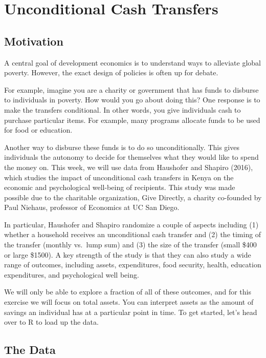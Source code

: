 \documentclass[
]{book}
\begin{document}
\chapter{Unconditional Cash Transfers}\label{unconditional-cash-transfers}

\section{Motivation}\label{motivation}

A central goal of development economics is to understand ways to alleviate global poverty. However, the exact design of policies is often up for debate.

For example, imagine you are a charity or government that has funds to disburse to individuals in poverty. How would you go about doing this? One response is to make the transfers conditional. In other words, you give individuals cash to purchase particular items. For example, many programs allocate funds to be used for food or education.

Another way to disburse these funds is to do so unconditionally. This gives individuals the autonomy to decide for themselves what they would like to spend the money on. This week, we will use data from Haushofer and Shapiro (2016)\citep{haushofer2016short}, which studies the impact of unconditional cash transfers in Kenya on the economic and psychological well-being of recipients. This study was made possible due to the charitable organization, Give Directly, a charity co-founded by Paul Niehaus, professor of Economics at UC San Diego.

In particular, Haushofer and Shapiro randomize a couple of aspects including (1) whether a household receives an unconditional cash transfer and (2) the timing of the transfer (monthly vs.~lump sum) and (3) the size of the transfer (small \$400 or large \$1500). A key strength of the study is that they can also study a wide range of outcomes, including assets, expenditures, food security, health, education expenditures, and psychological well being.

We will only be able to explore a fraction of all of these outcomes, and for this exercise we will focus on total assets. You can interpret assets as the amount of savings an individual has at a particular point in time. To get started, let's head over to R to load up the data.

\section{The Data}\label{the-data}
\end{document}
